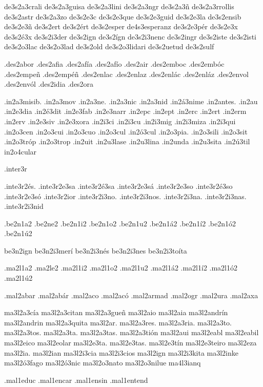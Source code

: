 {de3s2a3crali 
de3s2a3guisa 
de3s2a3lini 
de3s2a3ngr 
de3s2a3ñ 
de3s2a3rrollis 
de3s2astr 
de3s2a3zo 
de3s2e3c 
de3s2e3que 
de3s2e3guid 
de3s2e3la 
de3s2ensib 
de3s2e3ñ 
de3s2ert 
de3s2ért 
de3s2esper de4s3esperanz 
de3s2e3pér 
de3s2e3x 
de3s2é3x 
de3s2i3der 
de3s2ign 
de3s2ígn 
de3s2i3nenc 
de3s2ingr 
de3s2iste 
de3s2isti 
de3s2o3lac 
de3s2o3lad 
de3s2old 
de3s2o3lidari 
de3s2uetud 
de3s2sulf 

.des2abor 
.des2afia 
.des2afía 
.des2afío 
.des2air 
.des2emboc 
.des2embóc 
.des2empeñ 
.des2empéñ 
.des2enlac 
.des2enlaz 
.des2enlác 
.des2enláz 
.des2envol 
.des2envól 
.des2idia 
.des2ora 


.in2a3misib. 
.in2a3mov 
.in2a3ne. 
.in2a3nic 
.in2a3nid 
.in2á3nime 
.in2antes. 
.in2au 
.in2e3dia 
.in2é3dit 
.in2e3fab 
.in2e3narr 
.in2epc 
.in2ept 
.in2erc 
.in2ert 
.in2erm 
.in2erv 
.in2e3siv 
.in2e3xora 
.in2i3ci 
.in2i3cu 
.in2i3mig 
.in2i3miza 
.in2i3qui 
.in2o3cen 
.in2o3cui 
.in2o3cuo 
.in2o3cul 
.in2ó3cul 
.in2o3pia. 
.in2o3sili 
.in2o3sit 
.in2o3tróp 
.in2o3trop 
.in2uit 
.in2u3lase 
.in2u3lina 
.in2unda 
.in2u3sita 
.in2ú3til 
in2o4cular 

.inter3r 

.inte3r2és. .inte3r2e3sa .inte3r2é3sa .inte3r2e3sá .inte3r2e3so .inte3r2é3so .inte3r2e3só .inte3r2ior .inte3r2i3no. .inte3r2i3nos. .inte3r2i3na. .inte3r2i3nas. .inte3r2i3nid 

.be2n1a2 .be2ne2 .be2n1i2 .be2n1o2 .be2n1u2 .be2n1á2        .be2n1í2 .be2n1ó2 .be2n1ú2 

be3n2ign 
be3n2i3merí 
be3n2i3nés 
be3n2i3nes 
be3n2i3toíta 

.ma2l1a2 .ma2le2 .ma2l1i2 .ma2l1o2 .ma2l1u2 .ma2l1á2        .ma2l1í2 .ma2l1ó2 .ma2l1ú2 

.mal2abar 
.mal2abár 
.mal2aco 
.mal2acó 
.mal2armad 
.mal2ogr 
.mal2ura 
.mal2axa 

ma3l2a3cía 
ma3l2a3citan 
ma3l2a3gueñ 
ma3l2aio 
ma3l2aia 
ma3l2andrín 
ma3l2andrin 
ma3l2a3quita 
ma3l2ar. 
ma3l2a3res. 
ma3l2a3ria. 
ma3l2a3to. 
ma3l2a3tos. 
ma3l2a3ta. 
ma3l2a3tas. 
ma3l2a3tión 
ma3l2aui 
ma3l2eabl 
ma3l2eabil 
ma3l2eico 
ma3l2eolar 
ma3l2e3ta. 
ma3l2e3tas. 
ma3l2e3tín 
ma3l2e3teiro 
ma3l2eza 
ma3l2ia. 
ma3l2ian 
ma3l2i3cia 
ma3l2i3cios 
ma3l2ign 
ma3l2i3kita 
ma3l2inke 
ma3l2ó3fago 
ma3l2ó3nic 
ma3l2o3nato 
ma3l2o3nilue 
ma4l3ianq 

.mal1educ 
.mal1encar 
.mal1ensin 
.mal1entend 

}
